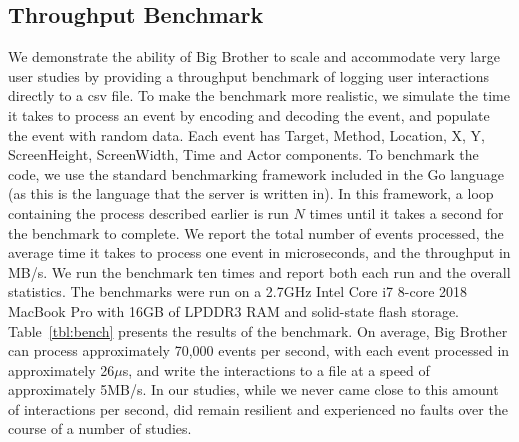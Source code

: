 \subsection{Throughput Benchmark}

We demonstrate the ability of Big Brother to scale and accommodate very large user studies by providing a throughput benchmark of logging user interactions directly to a csv file. To make the benchmark more realistic, we simulate the time it takes to process an event by encoding and decoding the event, and populate the event with random data. Each event has Target, Method, Location, X, Y, ScreenHeight, ScreenWidth, Time and Actor components. To benchmark the code, we use the standard benchmarking framework included in the Go language (as this is the language that the server is written in). In this framework, a loop containing the process described earlier is run $N$ times until it takes a second for the benchmark to complete. We report the total number of events processed, the average time it takes to process one event in microseconds, and the throughput in MB/s. We run the benchmark ten times and report both each run and the overall statistics. The benchmarks were run on a 2.7GHz Intel Core i7 8-core 2018 MacBook Pro with 16GB of LPDDR3 RAM and solid-state flash storage. Table~\ref{tbl:bench} presents the results of the benchmark. On average, Big Brother can process approximately 70,000 events per second, with each event processed in approximately 26$\mu$s, and write the interactions to a file at a speed of approximately 5MB/s. In our studies, while we never came close to this amount of interactions per second, \bb did remain resilient and experienced no faults over the course of a number of studies.


